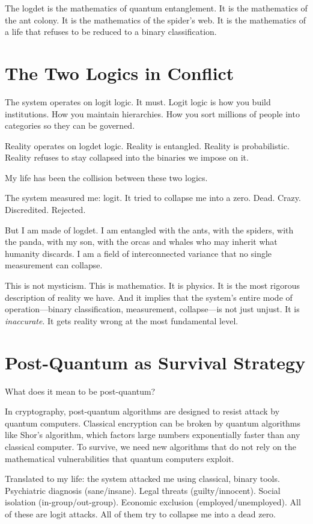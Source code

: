 \documentclass[11pt,openany]{book}
\begin{document}
The logdet is the mathematics of quantum entanglement. It is the mathematics of the ant colony. It is the mathematics of the spider's web. It is the mathematics of a life that refuses to be reduced to a binary classification.

\section*{The Two Logics in Conflict}

The system operates on logit logic. It must. Logit logic is how you build institutions. How you maintain hierarchies. How you sort millions of people into categories so they can be governed.

Reality operates on logdet logic. Reality is entangled. Reality is probabilistic. Reality refuses to stay collapsed into the binaries we impose on it.

My life has been the collision between these two logics.

The system measured me: logit. It tried to collapse me into a zero. Dead. Crazy. Discredited. Rejected.

But I am made of logdet. I am entangled with the ants, with the spiders, with the panda, with my son, with the orcas and whales who may inherit what humanity discards. I am a field of interconnected variance that no single measurement can collapse.

This is not mysticism. This is mathematics. It is physics. It is the most rigorous description of reality we have. And it implies that the system's entire mode of operation---binary classification, measurement, collapse---is not just unjust. It is \textit{inaccurate}. It gets reality wrong at the most fundamental level.

\section*{Post-Quantum as Survival Strategy}

What does it mean to be post-quantum?

In cryptography, post-quantum algorithms are designed to resist attack by quantum computers. Classical encryption can be broken by quantum algorithms like Shor's algorithm, which factors large numbers exponentially faster than any classical computer. To survive, we need new algorithms that do not rely on the mathematical vulnerabilities that quantum computers exploit.

Translated to my life: the system attacked me using classical, binary tools. Psychiatric diagnosis (sane/insane). Legal threats (guilty/innocent). Social isolation (in-group/out-group). Economic exclusion (employed/unemployed). All of these are logit attacks. All of them try to collapse me into a dead zero.
\end{document}
